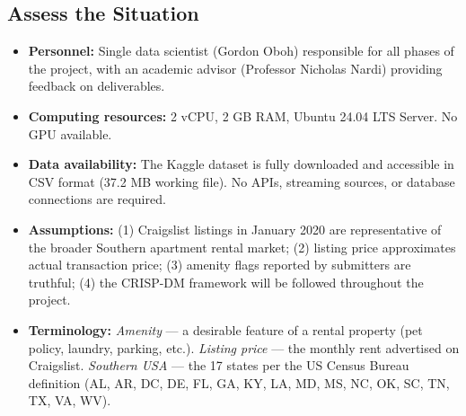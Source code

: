 \subsection{Assess the Situation}
\vspace{-9pt}
\begin{itemize}[itemsep=-9pt]
    \item \textbf{Personnel:} Single data scientist (Gordon Oboh) responsible for all phases of the project, with an academic advisor (Professor Nicholas Nardi) providing feedback on deliverables.
    \item \textbf{Computing resources:} 2 vCPU, 2 GB RAM, Ubuntu 24.04 LTS Server. No GPU available.
    \item \textbf{Data availability:} The Kaggle dataset is fully downloaded and accessible in CSV format (37.2 MB working file). No APIs, streaming sources, or database connections are required.
    \item \textbf{Assumptions:} (1) Craigslist listings in January 2020 are representative of the broader Southern apartment rental market; (2) listing price approximates actual transaction price; (3) amenity flags reported by submitters are truthful; (4) the CRISP-DM framework will be followed throughout the project.
    \item \textbf{Terminology:} \textit{Amenity} — a desirable feature of a rental property (pet policy, laundry, parking, etc.). \textit{Listing price} — the monthly rent advertised on Craigslist. \textit{Southern USA} — the 17 states per the US Census Bureau definition (AL, AR, DC, DE, FL, GA, KY, LA, MD, MS, NC, OK, SC, TN, TX, VA, WV).
\end{itemize}

\vspace{-9pt}
\noindent
